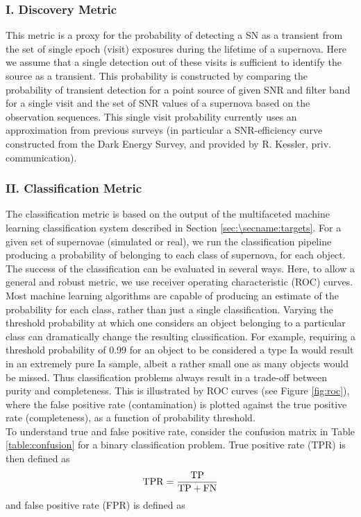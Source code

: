 \subsubsection{I. Discovery Metric}
This metric is a proxy for the probability of detecting a SN as a transient from the
set of single epoch (visit) exposures during the lifetime of a supernova. Here we
assume that a single detection out of these visits is sufficient to identify the
source as a transient. This probability is constructed by comparing the probability
of transient detection for a point source of given SNR and filter band for a single
visit and the set of SNR values of a supernova based on the observation sequences.
This single visit probability currently uses an approximation from previous surveys
(in particular a SNR-efficiency curve constructed from the Dark Energy Survey, and
provided by R. Kessler, priv. communication).

\subsubsection{II. Classification Metric}
The classification metric is based on the output of the multifaceted machine learning 
classification system described in Section \ref{sec:\secname:targets}. For a given set of supernovae 
(simulated or real), we run the classification pipeline producing a probability of belonging to 
each class of supernova, for each object. The success of the classification can be evaluated in 
several ways. Here, to allow a general and robust metric, we use receiver 
operating characteristic (ROC) curves.\\
Most machine learning algorithms are capable of producing an estimate of the probability for each 
class, rather than just a single classification. Varying the threshold probability at which one 
considers an object belonging to a particular class can dramatically change the 
resulting classification. For example, requiring a threshold probability of 0.99 for an object to 
be considered a type Ia would result in an extremely pure Ia sample, albeit a rather small one as 
many objects would be missed. Thus classification problems always result in a trade-off between 
purity and completeness. This is illustrated by ROC curves (see Figure \ref{fig:roc}), where the 
false positive rate (contamination) is plotted against the true positive rate (completeness), as a 
function of probability threshold.\\
To understand true and false positive rate, consider the confusion matrix in Table 
\ref{table:confusion} for a binary classification problem. True positive rate (TPR) is then defined 
as
\begin{equation}
 \rm{TPR} = \frac{\rm{TP}}{\rm{TP}+\rm{FN}}
\end{equation}
and false positive rate (FPR) is defined as

